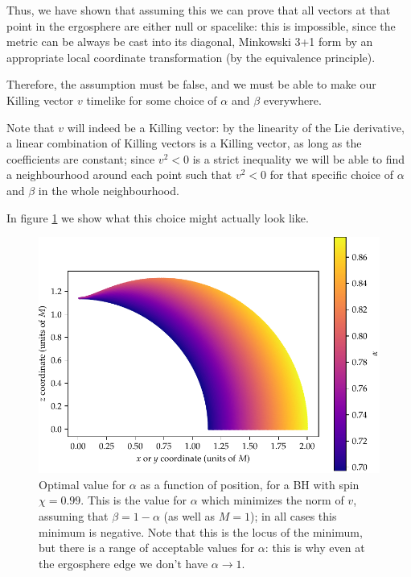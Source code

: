 \documentclass[main.tex]{subfiles}
\begin{document}
Thus, we have shown that assuming this we can prove that all vectors at that point in the ergosphere are either null or spacelike: 
this is impossible, since the metric can be always be cast into its diagonal, Minkowski 3+1 form by an appropriate local coordinate transformation (by the equivalence principle).

Therefore, the assumption must be false, and we must be able to make our Killing vector \(v\) timelike for some choice of \(\alpha \) and \(\beta \) everywhere.

Note that \(v\) will indeed be a Killing vector: by the linearity of the Lie derivative, a linear combination of Killing vectors is a Killing vector, as long as the coefficients are constant; since \(v^2 < 0\) is a strict inequality we will be able to find a neighbourhood around each point such that \(v^2 < 0\) for that specific choice of \(\alpha \) and \(\beta\) in the whole neighbourhood. 

In figure \ref{fig:kerr_killing} we show what this choice might actually look like.

\begin{figure}[ht]
\centering
\includegraphics[width=\textwidth]{figures/kerr_killing}
\caption{Optimal value for \(\alpha \) as a function of position, for a BH with spin \(\chi = 0.99\). This is the value for \(\alpha \) which minimizes the norm of \(v\), assuming that \(\beta = 1 - \alpha \) (as well as \(M = 1\)); in all cases this minimum is negative.
Note that this is the locus of the minimum, but there is a range of acceptable values for \(\alpha \): this is why even at the ergosphere edge we don't have \(\alpha \to 1\). }
\label{fig:kerr_killing}
\end{figure}
\end{document}
